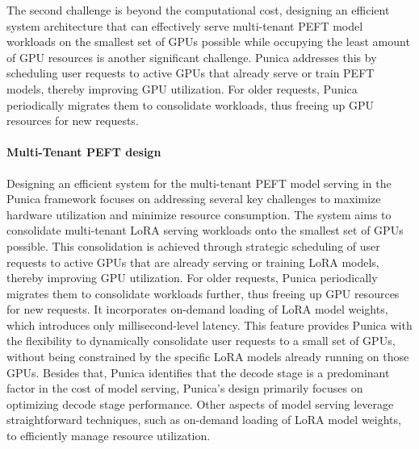 The second challenge is beyond the computational cost, designing an efficient system architecture that can effectively serve multi-tenant PEFT model workloads on the smallest set of GPUs possible while occupying the least amount of GPU resources is another significant challenge. Punica addresses this by scheduling user requests to active GPUs that already serve or train PEFT models, thereby improving GPU utilization. For older requests, Punica periodically migrates them to consolidate workloads, thus freeing up GPU resources for new requests.
\paragraph{Multi-Tenant PEFT design}
Designing an efficient system for the multi-tenant PEFT model serving in the Punica framework focuses on addressing several key challenges to maximize hardware utilization and minimize resource consumption. The system aims to consolidate multi-tenant LoRA serving workloads onto the smallest set of GPUs possible. This consolidation is achieved through strategic scheduling of user requests to active GPUs that are already serving or training LoRA models, thereby improving GPU utilization. For older requests, Punica periodically migrates them to consolidate workloads further, thus freeing up GPU resources for new requests. It incorporates on-demand loading of LoRA model weights, which introduces only millisecond-level latency. This feature provides Punica with the flexibility to dynamically consolidate user requests to a small set of GPUs, without being constrained by the specific LoRA models already running on those GPUs. Besides that, Punica identifies that the decode stage is a predominant factor in the cost of model serving, Punica's design primarily focuses on optimizing decode stage performance. Other aspects of model serving leverage straightforward techniques, such as on-demand loading of LoRA model weights, to efficiently manage resource utilization.